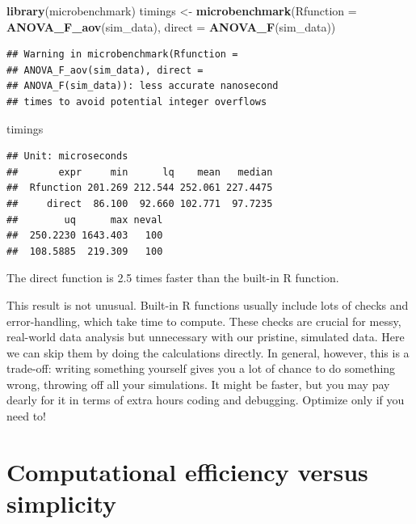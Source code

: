 \documentclass[
]{book}
\newenvironment{Shaded}{\begin{snugshade}}{\end{snugshade}}
\newcommand{\AttributeTok}[1]{\textcolor[rgb]{0.13,0.29,0.53}{#1}}
\newcommand{\FunctionTok}[1]{\textcolor[rgb]{0.13,0.29,0.53}{\textbf{#1}}}
\newcommand{\NormalTok}[1]{#1}
\newcommand{\OtherTok}[1]{\textcolor[rgb]{0.56,0.35,0.01}{#1}}
\begin{document}
\begin{Shaded}
\begin{Highlighting}[]
\FunctionTok{library}\NormalTok{(microbenchmark)}
\NormalTok{timings }\OtherTok{\textless{}{-}} \FunctionTok{microbenchmark}\NormalTok{(}\AttributeTok{Rfunction =} \FunctionTok{ANOVA\_F\_aov}\NormalTok{(sim\_data),}
                          \AttributeTok{direct    =} \FunctionTok{ANOVA\_F}\NormalTok{(sim\_data))}
\end{Highlighting}
\end{Shaded}

\begin{verbatim}
## Warning in microbenchmark(Rfunction =
## ANOVA_F_aov(sim_data), direct =
## ANOVA_F(sim_data)): less accurate nanosecond
## times to avoid potential integer overflows
\end{verbatim}

\begin{Shaded}
\begin{Highlighting}[]
\NormalTok{timings}
\end{Highlighting}
\end{Shaded}

\begin{verbatim}
## Unit: microseconds
##       expr     min      lq    mean   median
##  Rfunction 201.269 212.544 252.061 227.4475
##     direct  86.100  92.660 102.771  97.7235
##        uq      max neval
##  250.2230 1643.403   100
##  108.5885  219.309   100
\end{verbatim}

The direct function is 2.5 times faster than the built-in R function.

This result is not unusual.
Built-in R functions usually include lots of checks and error-handling, which take time to compute. These checks are crucial for messy, real-world data analysis but unnecessary with our pristine, simulated data.
Here we can skip them by doing the calculations directly.
In general, however, this is a trade-off: writing something yourself gives you a lot of chance to do something wrong, throwing off all your simulations. It might be faster, but you may pay dearly for it in terms of extra hours coding and debugging.
Optimize only if you need to!

\section{Computational efficiency versus simplicity}\label{sec_comp_efficiency}
\end{document}
